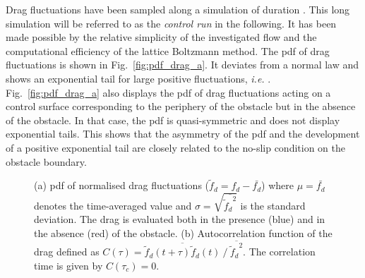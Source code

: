 \documentclass{jfm}
\newcommand{\EL}[1]{{\color{myred}{#1}}}
\newcommand{\QQ}[1]{{\color{green}{#1}}}
\begin{document}
Drag fluctuations have been sampled along a simulation of duration \EL{$T_{tot} = 4\times 10^6~T_0$}.
This long simulation will be referred to as the \textit{control run} in the following.
It has been made possible by the relative simplicity of the investigated flow and the computational efficiency of the lattice Boltzmann method. 
The \ac{pdf} of drag fluctuations is shown in Fig.~\ref{fig:pdf_drag_a}.
It deviates from a normal law and shows an exponential tail for large positive fluctuations, \textit{i.e.}  \EL{${\mathbb{P}}(f_d) \propto e^{-\ell f_d}$}.
%
Fig.~\ref{fig:pdf_drag_a} also displays the \ac{pdf} of drag fluctuations acting on a control surface corresponding to the periphery of the obstacle but in the absence of the obstacle. 
%
In that case, the \ac{pdf} is quasi-symmetric and does not display exponential tails. This shows that the asymmetry of the \ac{pdf} and the development of a positive exponential tail are closely related to the no-slip condition on the obstacle boundary.
\begin{figure}
	\centering
	\caption{{(a)} \ac{pdf} of normalised drag fluctuations ($\tilde f_d = f_d - \bar{f_d}$) where $\mu = \bar{f_d}$ denotes the time-averaged value and $\sigma = \sqrt{\overline{{\tilde f_d}^2}}$ is the standard deviation. The drag is evaluated both in the presence (blue) and in the absence (red) of the obstacle. %
		\QQ{x-axis is now $x = (f_d-\mu)/\sigma)$ and y-axis $P(x)$)}
		{(b)} Autocorrelation function of the drag defined as $C(\tau) = \overline{ \tilde f_d(t+\tau)\tilde f_d(t)} ~/~ \overline{{\tilde f_d}^2}$. The correlation time \EL{$\tau_c\simeq 4 T_0$} is given by $C(\tau_c)=0$.
	}
	\label{fig:pdf_drag}
\end{figure}
\end{document}
